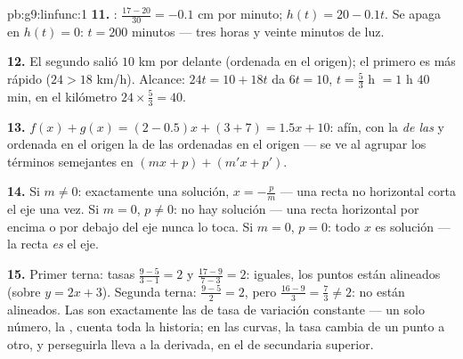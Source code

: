 \begin{solution}{pb:g9:linfunc:1}
\textbf{11.} : $\frac{17 - 20}{30} = -0.1$ cm por minuto;
$h(t) = 20 - 0.1t$. Se apaga en $h(t) = 0$: $t = 200$ minutos
--- tres horas y veinte minutos de luz.

\textbf{12.} El segundo salió $10$ km por delante (ordenada en el origen); el
primero es más rápido ($24 > 18$ km/h). Alcance:
$24t = 10 + 18t$ da $6t = 10$, $t = \frac53$ h $= 1$ h $40$
min, en el kilómetro $24 \times \frac53 = 40$.

\textbf{13.} $f(x) + g(x) = (2 - 0.5)x + (3 + 7) = 1.5x + 10$:
afín, con  la \emph{ de las } y ordenada en el origen
la  de las ordenadas en el origen --- se ve al agrupar los términos semejantes
en $(mx + p) + (m'x + p')$.

\textbf{14.} Si $m \neq 0$: exactamente una solución,
$x = -\frac pm$ --- una recta no horizontal corta el eje
una vez. Si $m = 0$, $p \neq 0$: no hay solución --- una recta horizontal
por encima o por debajo del eje nunca lo toca. Si $m = 0$, $p = 0$:
todo $x$ es solución --- la recta \emph{es} el eje.

\textbf{15.} Primer terna: tasas $\frac{9 - 5}{3 - 1} = 2$ y
$\frac{17 - 9}{7 - 3} = 2$: iguales, los puntos están alineados (sobre
$y = 2x + 3$). Segunda terna: $\frac{9-5}{2} = 2$, pero
$\frac{16 - 9}{3} = \frac73 \neq 2$: no están alineados. Las  son exactamente las de tasa de variación constante ---
un solo número, la , cuenta toda la historia; en las curvas, la
tasa cambia de un punto a otro, y perseguirla lleva
a la derivada, en el  de secundaria superior.
\end{solution}
